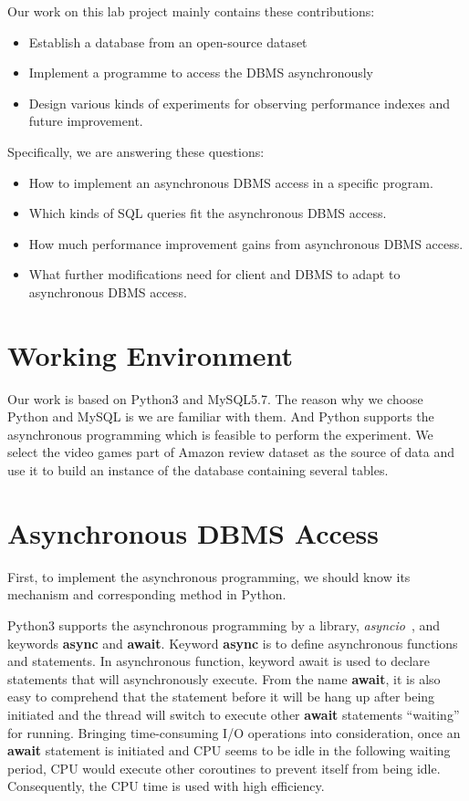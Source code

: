 \documentclass[onecolumn, conference, 12pt]{IEEEtran}
\begin{document}
	Our work on this lab project mainly contains these contributions:
	\begin{itemize}
		\item Establish a database from an open-source dataset
		\item Implement a programme to access the DBMS asynchronously
		\item Design various kinds of experiments for observing performance indexes and future improvement.
	\end{itemize}
	
	Specifically, we are answering these questions:
	\begin{itemize}
		\item How to implement an asynchronous DBMS access in a specific program.
		\item Which kinds of SQL queries fit the asynchronous DBMS access.
		\item How much performance improvement gains from asynchronous DBMS access.
		\item What further modifications need for client and DBMS to adapt to asynchronous DBMS access.
	\end{itemize}
	
	\section{Working Environment}
	Our work is based on Python3 and MySQL5.7. The reason why we choose Python and MySQL is we are familiar with them. And Python supports the asynchronous programming which is feasible to perform the experiment. We select the video games part of Amazon review dataset as the source of data and use it to build an instance of the database containing several tables.
	
	\section{Asynchronous DBMS Access}
	First, to implement the asynchronous programming, we should know its mechanism and corresponding method in Python. 
	
	Python3 supports the asynchronous programming by a library, \textit{asyncio}~\cite{asyncio}, and keywords \textbf{async} and \textbf{await}. Keyword \textbf{async} is to define asynchronous functions and statements. In asynchronous function, keyword await is used to declare statements that will asynchronously execute. From the name \textbf{await}, it is also easy to comprehend that the statement before it will be hang up after being initiated and the thread will switch to execute other \textbf{await} statements ``waiting'' for running. Bringing time-consuming I/O operations into consideration, once an \textbf{await} statement is initiated and CPU seems to be idle in the following waiting period, CPU would execute other coroutines to prevent itself from being idle. Consequently, the CPU time is used with high efficiency. 
	
\end{document}
